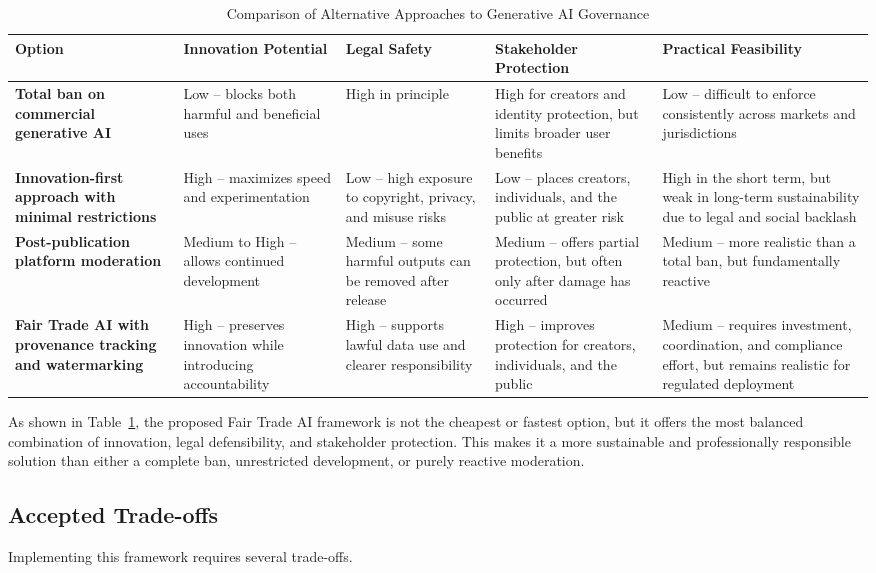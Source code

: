 \begin{table}[H]
\centering
\caption{Comparison of Alternative Approaches to Generative AI Governance}
\label{tab:solution-comparison}
\renewcommand{\arraystretch}{1.2}
\small
\begin{tabularx}{\textwidth}{|p{3cm}|p{2.8cm}|p{2.5cm}|p{2.8cm}|X|}
\hline
\textbf{Option} & \textbf{Innovation Potential} & \textbf{Legal Safety} & \textbf{Stakeholder Protection} & \textbf{Practical Feasibility} \\
\hline
\textbf{Total ban on commercial generative AI} & Low -- blocks both harmful and beneficial uses & High in principle & High for creators and identity protection, but limits broader user benefits & Low -- difficult to enforce consistently across markets and jurisdictions \\
\hline
\textbf{Innovation-first approach with minimal restrictions} & High -- maximizes speed and experimentation & Low -- high exposure to copyright, privacy, and misuse risks & Low -- places creators, individuals, and the public at greater risk & High in the short term, but weak in long-term sustainability due to legal and social backlash \\
\hline
\textbf{Post-publication platform moderation} & Medium to High -- allows continued development & Medium -- some harmful outputs can be removed after release & Medium -- offers partial protection, but often only after damage has occurred & Medium -- more realistic than a total ban, but fundamentally reactive \\
\hline
\textbf{Fair Trade AI with provenance tracking and watermarking} & High -- preserves innovation while introducing accountability & High -- supports lawful data use and clearer responsibility & High -- improves protection for creators, individuals, and the public & Medium -- requires investment, coordination, and compliance effort, but remains realistic for regulated deployment \\
\hline
\end{tabularx}
\end{table}

As shown in Table~\ref{tab:solution-comparison}, the proposed Fair Trade AI framework is not the cheapest or fastest option, but it offers the most balanced combination of innovation, legal defensibility, and stakeholder protection. This makes it a more sustainable and professionally responsible solution than either a complete ban, unrestricted development, or purely reactive moderation.

\subsection{Accepted Trade-offs}
Implementing this framework requires several trade-offs.

